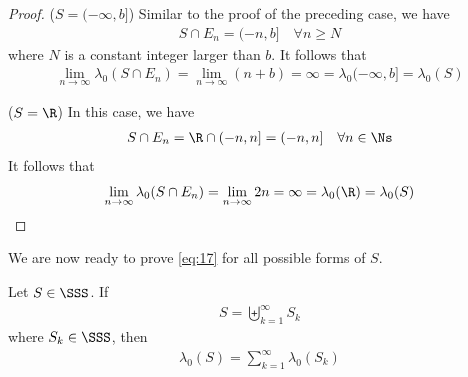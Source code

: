 \documentclass[thmcnt=section, 12pt]{elegantbook}
\begin{document}
\begin{proof}
    \par ($S = (-\infty, b]$) Similar to the proof of the preceding case, we have 
    \begin{align*}
        S \cap E_n = (-n, b]
        \quad \forall n \geq N
    \end{align*}
    where $N$ is a constant integer larger than $b$. It follows that 
    \begin{align*}
        \lim_{n\to\infty} \lambda_0(S \cap E_n)
        = \lim_{n\to\infty} (n+b)
        = \infty
        = \lambda_0 (-\infty, b]
        = \lambda_0(S)
    \end{align*}

    ($S = \R$) In this case, we have 
    \begin{align*}
        S \cap E_n = \R \cap (-n, n]
        = (-n, n] 
        \quad \forall n \in \Ns
    \end{align*}
    It follows that 
    \begin{align*}
        \lim_{n\to\infty} \lambda_0(S \cap E_n)
        = \lim_{n\to\infty} 2n
        = \infty
        = \lambda_0(\R)
        = \lambda_0(S)
    \end{align*}
\end{proof}


\par We are now ready to prove \eqref{eq:17} for all possible forms of $S$.

\begin{lemma}
    Let $S \in \SSS$. If 
    \begin{align*}
        S = \biguplus_{k=1}^\infty S_k
    \end{align*}
    where $S_k \in \SSS$, then 
    \begin{align}
        \lambda_0(S) = \sum_{k=1}^\infty \lambda_0(S_k) 
        \label{eq:12}
    \end{align}
\end{lemma}
\end{document}
